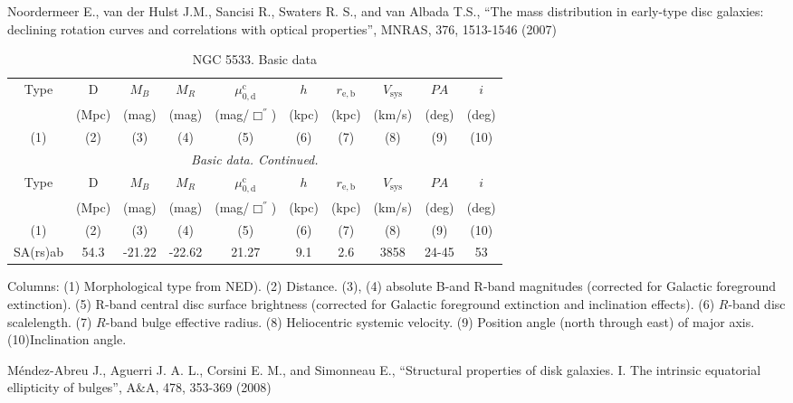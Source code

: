 \documentclass[english,10pt]{article}
\def\mm{\mathrm}
\begin{document}
\bigskip
\noindent
Noordermeer E., van der Hulst J.M., Sancisi R., 
Swaters R. S., and van Albada T.S., 
``The mass distribution in early-type disc galaxies: declining rotation
curves and correlations with optical properties'', 
MNRAS, 376, 1513-1546 (2007)

\begin{longtable}[c]{cccccccccc}
\caption{NGC 5533. Basic data} \\ 
\hline 
Type & D & $M_B$ & $M_R$ & $\mu_\mm{0,d}^\mm{c}$ & $h$ & $r_\mm{e,b}$
& $V_\mm{sys}$ & $PA$ & $i$ \\ 
& (Mpc) & (mag) & (mag) & (mag/$\Box^{''}$) & (kpc) & (kpc)
& (km/s) & (deg) & (deg) \\
(1)&(2)&(3)&(4)&(5)&(6)&(7)&(8)&(9)&(10) \\ 
\hline
\endfirsthead 
\hline
\multicolumn{10}{c}{\small\slshape Basic data. 
Continued. } \\ \hline
Type & D & $M_B$ & $M_R$ & $\mu_\mm{0,d}^\mm{c}$ & $h$ & $r_\mm{e,b}$
& $V_\mm{sys}$ & $PA$ & $i$ \\ 
& (Mpc) & (mag) & (mag) & (mag/$\Box^{''}$) & (kpc) & (kpc)
& (km/s) & (deg) & (deg) \\
(1)&(2)&(3)&(4)&(5)&(6)&(7)&(8)&(9)&(10) \\ 
\hline
\endhead 
\hline
SA(rs)ab & 54.3 & -21.22 & -22.62 & 21.27 & 9.1 & 2.6 
& 3858 & 24-45 & 53 \tabularnewline
\hline
\end{longtable}

Columns: 
(1) Morphological type from NED). 
(2) Distance. 
(3), (4) absolute B-and R-band magnitudes 
(corrected for Galactic foreground extinction).
(5) R-band central disc surface brightness 
(corrected for Galactic foreground extinction and inclination effects).
(6) $R$-band disc scalelength.
(7) $R$-band bulge effective radius.
(8) Heliocentric systemic velocity.
(9) Position angle (north through east) of major axis. 
(10)Inclination angle.

\bigskip
\noindent
M\'{e}ndez-Abreu J., Aguerri J. A. L., Corsini E. M., 
and Simonneau E., 
``Structural properties of disk galaxies. I. The intrinsic 
equatorial ellipticity of bulges'', 
A\&A, 478, 353-369 (2008)
\end{document}
